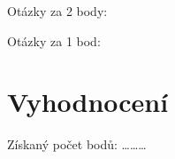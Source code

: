 \documentclass[
	13pt,
	a4paper,
	oneside]{sdapsclassic} %
\begin{document}
\begin{questionnaire}[noinfo]
\begin{Form}
\begin{multicols}{4}
		\begin{optiongroup}{Otázky za 2 body:}
		\end{optiongroup}
    
		\begin{optiongroup}{Otázky za 1 bod:}
        \end{optiongroup}

        \end{multicols}

        \section{Vyhodnocení}

        \bigskip
        \begin{flushright}
        Získaný počet bodů: \dots\dots\dots
        \end{flushright}

        \end{Form}
    	\end{questionnaire}
\end{document}
